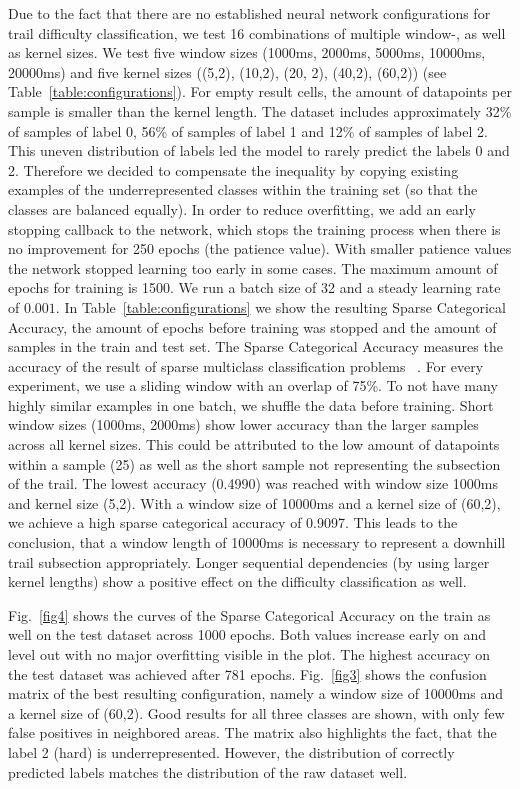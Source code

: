 \documentclass[runningheads]{llncs}
\begin{document}
Due to the fact that there are no established neural network configurations for trail difficulty classification, we test 16 combinations of multiple window-, as well as kernel sizes.
We test five window sizes (1000ms, 2000ms, 5000ms, 10000ms, 20000ms) and five kernel sizes ((5,2), (10,2), (20, 2), (40,2), (60,2)) (see Table~\ref{table:configurations}).
For empty result cells, the amount of datapoints per sample is smaller than the kernel length.
The dataset includes approximately 32\% of samples of label 0, 56\% of samples of label 1 and 12\% of samples of label 2.
This uneven distribution of labels led the model to rarely predict the labels 0 and 2.
Therefore we decided to compensate the inequality by copying existing examples of the underrepresented classes within the training set (so that the classes are balanced equally).
In order to reduce overfitting, we add an early stopping callback to the network, which stops the training process when there is no improvement for 250 epochs (the patience value).
With smaller patience values the network stopped learning too early in some cases.
The maximum amount of epochs for training is 1500.
We run a batch size of 32 and a steady learning rate of $0.001$.
In Table~\ref{table:configurations} we show the resulting Sparse Categorical Accuracy, the amount of epochs before training was stopped and the amount of samples in the train and test set.
The Sparse Categorical Accuracy measures the accuracy of the result of sparse multiclass classification problems ~\cite{moolayil2019keras}.
For every experiment, we use a sliding window with an overlap of 75\%.
To not have many highly similar examples in one batch, we shuffle the data before training.
Short window sizes (1000ms, 2000ms) show lower accuracy than the larger samples across all kernel sizes.
This could be attributed to the low amount of datapoints within a sample (25) as well as the short sample not representing the subsection of the trail.
The lowest accuracy (0.4990) was reached with window size 1000ms and kernel size (5,2).
With a window size of 10000ms and a kernel size of (60,2), we achieve a high sparse categorical accuracy of 0.9097.
This leads to the conclusion, that a window length of 10000ms is necessary to represent a downhill trail subsection appropriately.
Longer sequential dependencies (by using larger kernel lengths) show a positive effect on the difficulty classification as well.

Fig.~\ref{fig4} shows the curves of the Sparse Categorical Accuracy on the train as well on the test dataset across 1000 epochs.
Both values increase early on and level out with no major overfitting visible in the plot.
The highest accuracy on the test dataset was achieved after 781 epochs.
Fig.~\ref{fig3} shows the confusion matrix of the best resulting configuration, namely a window size of 10000ms and a kernel size of (60,2).
Good results for all three classes are shown, with only few false positives in neighbored areas. 
The matrix also highlights the fact, that the label 2 (hard) is underrepresented.
However, the distribution of correctly predicted labels matches the distribution of the raw dataset well.
\end{document}
